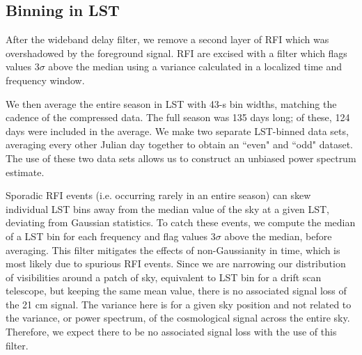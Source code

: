 \documentclass[twocolumn,numberedappendix]{emulateapj} \shorttitle{New Limits on the 21 cm Power Spectrum at $z=8.4$}
\begin{document}
\subsection{Binning in LST}\label{sec:lstbin}

After the wideband delay filter, we remove a second layer of RFI 
 which was overshadowed by the foreground signal. RFI are excised with a filter
which flags values $3\sigma$ above the median using a variance calculated in a
localized time and frequency window.  

We then average the entire season in LST with 43-s bin widths, matching the
cadence of the compressed data. The full season was 135 days long; of these,
124 days were included in the average. We make two separate LST-binned data
sets, averaging every other Julian day together to obtain an ``even" and ``odd"
dataset. The use of these two data sets allows us to construct an unbiased
power spectrum estimate.


Sporadic RFI events (i.e. occurring rarely in an entire season) can skew
individual LST bins away from the median value of the sky at a given LST,
deviating from Gaussian statistics. To catch these events, we compute the median
of a LST bin for each frequency and flag values 3$\sigma$ above the median,
before averaging. This filter mitigates the effects of non-Gaussianity in time,
which is most likely due to spurious RFI events. Since we are narrowing our
distribution of visibilities around a patch of sky, equivalent to LST bin for a
drift scan telescope, but keeping the same mean value, there is no associated
signal loss of the 21 cm signal. The variance here is for a given sky position
and not related to the variance, or power spectrum, of the cosmological signal
across the entire sky.  Therefore, we expect there to be no associated signal
loss with the use of this filter.
\end{document}
